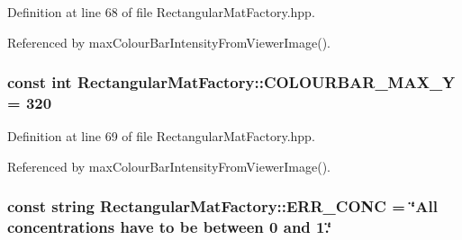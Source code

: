 \-Definition at line 68 of file \-Rectangular\-Mat\-Factory.\-hpp.



\-Referenced by max\-Colour\-Bar\-Intensity\-From\-Viewer\-Image().

\hypertarget{classmultiscale_1_1analysis_1_1RectangularMatFactory_a5a9cd4ea96ec3c9bddcf610d397d187a}{
\subsubsection[{\-C\-O\-L\-O\-U\-R\-B\-A\-R\-\_\-\-M\-A\-X\-\_\-\-Y}]{\setlength{\rightskip}{0pt plus 5cm}const int {\bf \-Rectangular\-Mat\-Factory\-::\-C\-O\-L\-O\-U\-R\-B\-A\-R\-\_\-\-M\-A\-X\-\_\-\-Y} = 320}}\label{classmultiscale_1_1analysis_1_1RectangularMatFactory_a5a9cd4ea96ec3c9bddcf610d397d187a}


\-Definition at line 69 of file \-Rectangular\-Mat\-Factory.\-hpp.



\-Referenced by max\-Colour\-Bar\-Intensity\-From\-Viewer\-Image().

\hypertarget{classmultiscale_1_1analysis_1_1RectangularMatFactory_a43300d891b115e25dfa33507c74cb8ab}{
\subsubsection[{\-E\-R\-R\-\_\-\-C\-O\-N\-C}]{\setlength{\rightskip}{0pt plus 5cm}const string {\bf \-Rectangular\-Mat\-Factory\-::\-E\-R\-R\-\_\-\-C\-O\-N\-C} = \char`\"{}\-All concentrations have to be between 0 and 1.\char`\"{}}}\label{classmultiscale_1_1analysis_1_1RectangularMatFactory_a43300d891b115e25dfa33507c74cb8ab}


